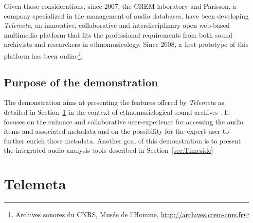 \documentclass[runningheads,a4paper]{llncs}
\begin{document}
Given those considerations, since 2007, the CREM laboratory and Parisson, a company specialized in the management of audio databases, have been developing \emph{Telemeta}, an innovative, collaborative and interdisciplinary open web-based multimedia platform that fits the professional requirements from both sound archivists and researchers in ethnomusicology. Since 2008, a first prototype of this platform has been online\footnote{Archives sonores du CNRS, Musée de l'Homme, \url{http://archives.crem-cnrs.fr}}.





 
\subsection*{Purpose of the demonstration}
The demonstration aims at presenting the features offered by \emph{Telemeta} as detailed in Section~\ref{sec:Telemeta} in the context of ethnomusiclogical sound archives \cite{telemetaCREM}. It focuses on the enhance and collaborative user-experience for accessing the audio items and associated metadata and on the possibility for the expert user to further enrich those metadata.
Another goal of this demonstration is to present the integrated audio analysis tools described in Section~\ref{sec:Timeside}


\section{Telemeta}\label{sec:Telemeta}
\end{document}
